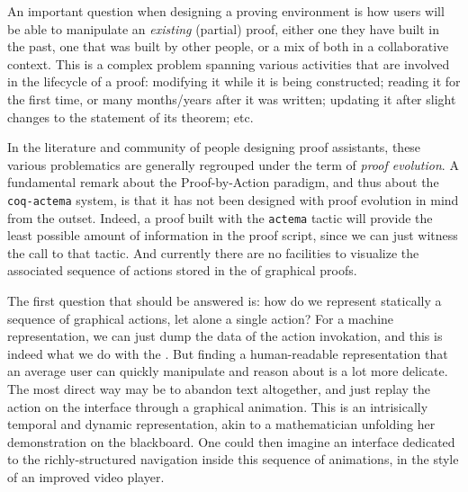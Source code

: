 An important question when designing a proving environment is how users will be
able to manipulate an \emph{existing} (partial) proof, either one they have
built in the past, one that was built by other people, or a mix of both in a
collaborative context. This is a complex problem spanning various activities
that are involved in the lifecycle of a proof: modifying it while it is being
constructed; reading it for the first time, or many months/years after it was
written; updating it after slight changes to the statement of its theorem;
etc.

In the literature and community of people designing proof assistants, these
various problematics are generally regrouped under the term of \emph{proof
evolution}. A fundamental remark about the Proof-by-Action paradigm, and thus
about the \texttt{coq-actema} system, is that it has not been designed with
proof evolution in mind from the outset. Indeed, a proof built with the
\texttt{actema} tactic will provide the least possible amount of information in
the proof script, since we can just witness the call to that tactic. And
currently there are no facilities to visualize the associated sequence of
actions stored in the  of graphical proofs.

The first question that should be answered is: how do we represent statically a
sequence of graphical actions, let alone a single action? For a machine
representation, we can just dump the data of the action invokation, and this is
indeed what we do with the . But finding a human-readable
representation that an average user can quickly manipulate and reason about is a
lot more delicate. The most direct way may be to abandon text altogether, and
just replay the action on the interface through a graphical animation. This is
an intrisically temporal and dynamic representation, akin to a mathematician
unfolding her demonstration on the blackboard. One could then imagine an
interface dedicated to the richly-structured navigation inside this sequence of
animations, in the style of an improved video player.

